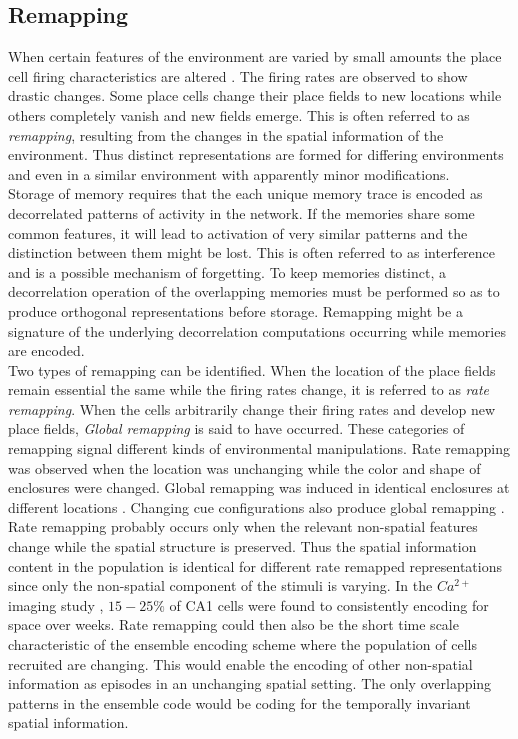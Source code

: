 \subsection{Remapping}
\label{remapping}
When certain features of the environment are varied by small amounts the place cell firing characteristics are altered \cite{Kubie1987}. The firing rates are observed to show drastic changes. Some place cells change their place fields to new locations while others completely vanish and new fields emerge. This is often referred to as \emph{remapping}, resulting from the changes in the spatial information of the environment. Thus distinct representations are formed for differing environments and even in a similar environment with apparently minor modifications. \\
Storage of memory requires that the each unique memory trace is encoded as decorrelated patterns of activity in the network. If the memories share some common features, it will lead to activation of very similar patterns and the distinction between them might be lost. This is often referred to as interference and is a possible mechanism of forgetting. To keep memories distinct, a decorrelation operation of the overlapping memories must be performed so as to produce orthogonal representations before storage. Remapping might be a signature of the underlying decorrelation computations occurring while memories are encoded.\\
Two types of remapping can be identified. When the location of the place fields remain essential the same while the firing rates change, it is referred to as \emph{rate remapping}. When the cells arbitrarily change their firing rates and develop new place fields, \emph{Global remapping} is said to have occurred. These categories of remapping signal different kinds of environmental manipulations. Rate remapping was observed when the location was unchanging while the color and shape of enclosures were changed. Global remapping was induced in identical enclosures at different locations \cite{Leutgeb2005a}. Changing cue configurations also produce global remapping \cite{Leutgeb2005a}.
Rate remapping probably occurs only when the relevant non-spatial features change while the spatial structure is preserved. Thus the spatial information content in the population is identical for different rate remapped representations since only the non-spatial component of the stimuli is varying. In the $Ca^{2+}$ imaging study \cite{Ziv2013}, $15-25 \% $ of CA1 cells were found to consistently encoding for space over weeks. Rate remapping could then also be the short time scale characteristic of the ensemble encoding scheme where the population of cells recruited are changing. This would enable the encoding of other non-spatial information as episodes in an unchanging spatial setting. The only overlapping patterns in the ensemble code would be coding for the temporally invariant spatial information. \\
